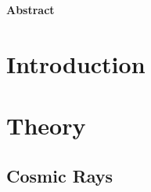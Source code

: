 \documentclass[a4paper]{report}
\numberwithin{equation}{section}
\begin{document}
\begin{titlepage}
	\vspace*{5em}

	\begin{minipage}{0.8\textwidth}
		\begin{centering}
			\textbf{Abstract}\\[0.2cm]
            
		\end{centering}
	\end{minipage}
	
	
	
	
	
	
	 
	
	
\end{titlepage}



\tableofcontents

\chapter{Introduction} \label{chap:intro}



\chapter{Theory} \label{chap:theory}

\section{Cosmic Rays}
\end{document}
